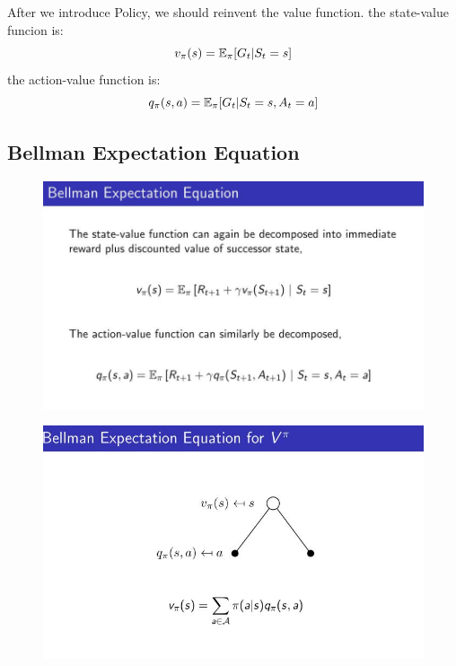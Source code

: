 \documentclass[10pt, a4paper, twocolumn]{article} %
\begin{document}
After we introduce Policy, we should reinvent the value function.
the state-value funcion is:
$$v_{\pi}(s) = \Bbb{E}_{\pi}[G_{t} | S_{t} = s] $$
the action-value function is:
$$q_{\pi}(s, a) = \Bbb{E}_{\pi}[G_{t} | S_{t} = s, A_{t} = a] $$

\subsection{Bellman Expectation Equation}

\begin{figure}[H]
	\begin{centering}
		\includegraphics[width = \linewidth]{bellmanEE.jpg}
	\end{centering}
\end{figure}

\begin{figure}[H]
	\begin{centering}
		\includegraphics[width = \linewidth]{bellmanV.jpg}
	\end{centering}
\end{figure}
\end{document}
